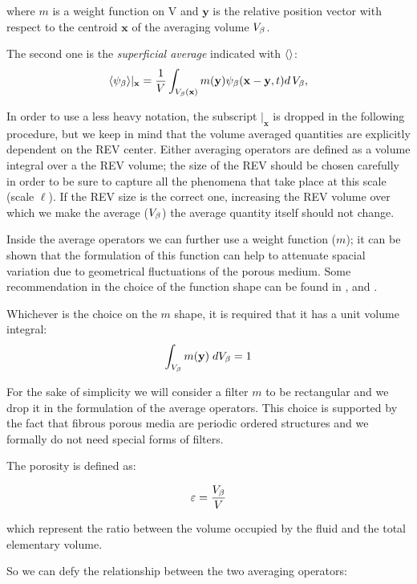 where $m$ is a weight function on V and $\mathbf{y}$ is the relative position vector with respect to the centroid $\mathbf{x}$ of the averaging volume $V_\beta$.

The second one is the \textit{superficial average} indicated with ${\left<  \right>}$:
\begin{equation}
{\left< \psi_{\beta} \right>}|_{\mathbf{x}} = \dfrac{1}{V} \int_{V_\beta(\mathbf{x})} m(\mathbf{y}) \psi_{\beta}(\mathbf{x}-\mathbf{y}, t) d \, V_\beta,
\label{eq:avg_superficial}
\end{equation}

In order to use a less heavy notation, the subscript $|_{\mathbf{x}}$ is dropped in the following procedure, but we keep in mind that the volume averaged quantities are explicitly dependent on the REV center.
Either averaging operators are defined as a volume integral over a the REV volume; the size of the REV should be chosen carefully in order to be sure to capture all the phenomena that take place at this scale (scale $\ell$).
If the REV size is the correct one, increasing the REV volume over which we make the average ($V_\beta$) the average quantity itself should not change.

Inside the average operators we can further use a weight function ($m$); it can be shown that the formulation of this function can help to attenuate spacial variation due to geometrical fluctuations of the porous medium.
Some recommendation in the choice of the function shape can be found in \citet{quintard1994transport1}, \citet{quintard1994transport2} and \citet{davit2017technical}.

Whichever is the choice on the $m$ shape, it is required that it has a unit volume integral:
$$
\int_{V_\beta}  m(\mathbf{y}) \; dV_\beta = 1
$$

For the sake of simplicity we will consider a filter $m$ to be rectangular and we drop it in the formulation of the average operators.
This choice is supported by the fact that fibrous porous media are periodic ordered structures and we formally do not need special forms of filters.

The porosity is defined as:

\begin{equation}
	\varepsilon = \dfrac{V_\beta}{V}
	\label{eq:porosity}
\end{equation}

which represent the ratio between the volume occupied by the fluid and the total elementary volume.

So we can defy the relationship between the two averaging operators:

